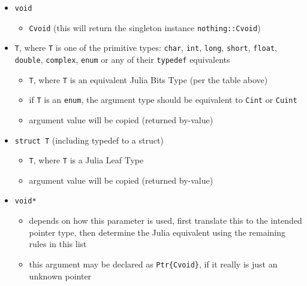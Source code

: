 \begin{itemize}
\item \texttt{void}

\begin{itemize}
\item \texttt{Cvoid} (this will return the singleton instance \texttt{nothing::Cvoid})

\end{itemize}

\item \texttt{T}, where \texttt{T} is one of the primitive types: \texttt{char}, \texttt{int}, \texttt{long}, \texttt{short}, \texttt{float}, \texttt{double}, \texttt{complex}, \texttt{enum} or any of their \texttt{typedef} equivalents

\begin{itemize}
\item \texttt{T}, where \texttt{T} is an equivalent Julia Bits Type (per the table above)


\item if \texttt{T} is an \texttt{enum}, the argument type should be equivalent to \texttt{Cint} or \texttt{Cuint}


\item argument value will be copied (returned by-value)

\end{itemize}

\item \texttt{struct T} (including typedef to a struct)

\begin{itemize}
\item \texttt{T}, where \texttt{T} is a Julia Leaf Type


\item argument value will be copied (returned by-value)

\end{itemize}

\item \texttt{void*}

\begin{itemize}
\item depends on how this parameter is used, first translate this to the intended pointer type, then determine the Julia equivalent using the remaining rules in this list


\item this argument may be declared as \texttt{Ptr\{Cvoid\}}, if it really is just an unknown pointer


\end{itemize}
\end{itemize}
